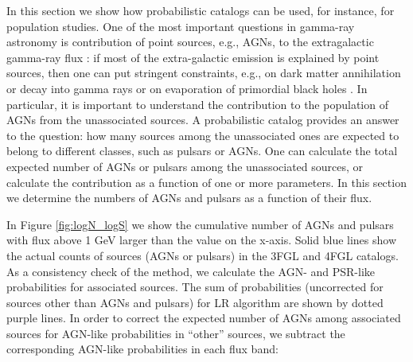 In this section we show how probabilistic catalogs can be used, for instance, for population studies.
One of the most important questions in gamma-ray astronomy is contribution of point sources, 
e.g., AGNs, to the extragalactic gamma-ray flux \citep[e.g.,][]{2010ApJ...720..435A, 2011ApJ...738..181M, 2016PhRvL.116o1105A, 2016ApJS..225...18Z, 2016ApJ...826L..31Z, 2016ApJ...832..117L, 2018ApJ...856..106D}:
if most of the extra-galactic emission is explained by point sources, then one can put stringent constraints, 
e.g., on  dark matter annihilation or decay into gamma rays 
\citep{2015ApJ...800L..27A, 2015PhRvD..91l3001D, 2015JCAP...09..008F, 2015PhR...598....1F, 2017ChPhC..41d5104L} or 
on evaporation of primordial black holes \citep{2010PhRvD..81j4019C}.
In particular, it is important to understand the contribution to the population of AGNs from the unassociated sources.
A probabilistic catalog provides an answer to the question: how many sources among the unassociated ones are expected to belong to different classes, such as pulsars or AGNs. 
One can calculate the total expected number of AGNs or pulsars among the unassociated sources, or calculate the contribution as a function of one or more parameters.
In this section we determine the numbers of AGNs and pulsars as a function of their flux.

In Figure \ref{fig:logN_logS} we show the cumulative number of AGNs and pulsars with flux above 1 GeV larger than the
value on the x-axis.
Solid blue lines show the actual counts of sources (AGNs or pulsars) in the 3FGL and 4FGL catalogs.
As a consistency check of the method, we calculate the AGN- and PSR-like probabilities for associated sources.
The sum of probabilities (uncorrected for sources other than AGNs and pulsars) for LR algorithm are shown by dotted purple lines.
In order to correct the expected number of AGNs among associated sources for AGN-like probabilities in ``other'' sources, 
we subtract the corresponding AGN-like probabilities in each flux band:

